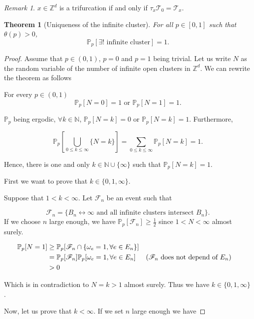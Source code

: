\documentclass[a4paper,11pt]{article}
\theoremstyle{plain}
\newtheorem{theorem}{Theorem}[section]
\theoremstyle{definition}
\theoremstyle{remark}
\newtheorem*{remark}{Remark}
\begin{document}
\begin{remark}
$x \in \mathbb{Z}^d$ is a trifurcation if and only if $\tau_x \mathscr{T}_0 = \mathscr{T}_x$.
\end{remark}

\begin{theorem}[Uniqueness of the infinite cluster]
\label{unique_infcluster}
For all $p \in [0,1]$ such that $\theta(p) > 0$,
\[\mathbb{P}_p[\exists! \text{ infinite cluster}] = 1.\]
\end{theorem}

\begin{proof}
Assume that $p \in (0,1)$, $p = 0$ and $p = 1$ being trivial. Let us write $N$ as the random variable of the number of infinite open clusters in $\mathbb{Z}^d$.
We can rewrite the theorem as follows

For every $p \in (0, 1)$
\[ \mathbb{P}_p[N = 0] = 1 \text{ or } \mathbb{P}_p[N = 1] = 1.\]

$\mathbb{P}_p$ being ergodic, $\forall k \in \mathbb{N}$, $\mathbb{P}_p[N = k] = 0$ or $\mathbb{P}_p[N = k] = 1$.
Furthermore,

\[ \mathbb{P}_p\left[\bigcup_{0 \leq k \leq \infty}{\{N = k\}}\right] =  \sum_{0 \leq k \leq \infty}{\mathbb{P}_p[N = k]} = 1.\]

Hence, there is one and only $k \in \mathbb{N} \cup \{ \infty \}$ such that $\mathbb{P}_p[N = k] = 1$.

First we want to prove that $k \in \{0, 1, \infty\}$.

Suppose that $1 < k < \infty$.
Let $\mathscr{F}_n$ be an event such that

\[ \mathscr{F}_n = \{B_n \longleftrightarrow \infty \text{ and all infinite clusters intersect } B_n \}. \]
If we choose $n$ large enough, we have $\mathbb{P}_p[\mathscr{F}_n] \geq \frac{1}{2}$ since $1 < N < \infty$ almost surely.

\begin{align*}
\mathbb{P}_p[N = 1] &\geq \mathbb{P}_p[\mathscr{F}_n \cap \{\omega_e = 1, \space \forall e \in E_n \}] \\
&= \mathbb{P}_p[\mathscr{F}_n]\mathbb{P}_p[\omega_e = 1, \space \forall e \in E_n] && (\mathscr{F}_n \text{ does not depend of } E_n) \\
&> 0
\end{align*}

Which is in contradiction to $N = k > 1$ almost surely.
Thus we have $k \in \{0, 1, \infty \}$.

Now, let us prove that $k < \infty$. If we set $n$ large enough we have


\end{proof}
\end{document}
